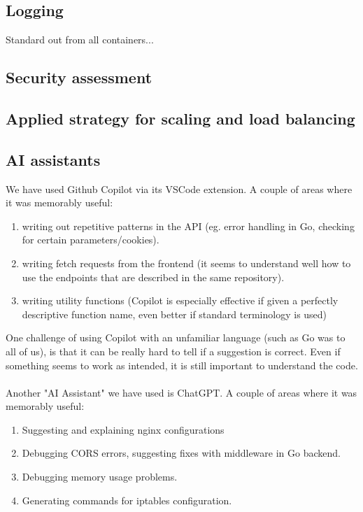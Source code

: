 \subsection{Logging}
Standard out from all containers...
\subsection{Security assessment}

\subsection{Applied strategy for scaling and load balancing}
\subsection{AI assistants}
We have used Github Copilot via its VSCode extension.
A couple of areas where it was memorably useful:
\begin{enumerate}
    \item writing out repetitive patterns in the API (eg. error handling in Go, checking for certain parameters/cookies).
    \item writing fetch requests from the frontend (it seems to understand well how to use the endpoints that are described in the same repository).
    \item writing utility functions (Copilot is especially effective if given a perfectly descriptive function name, even better if standard terminology is used)
\end{enumerate} 
One challenge of using Copilot with an unfamiliar language (such as Go was to all of us), is that it can be really hard to tell if a suggestion is correct. Even if something seems to work as intended, it is still important to understand the code. \\\\
Another "AI Assistant" we have used is ChatGPT. A couple of areas where it was memorably useful: 
\begin{enumerate}
    \item Suggesting and explaining nginx configurations
    \item Debugging CORS errors, suggesting fixes with middleware in Go backend.
    \item Debugging memory usage problems. 
    \item Generating commands for iptables configuration.
\end{enumerate}
